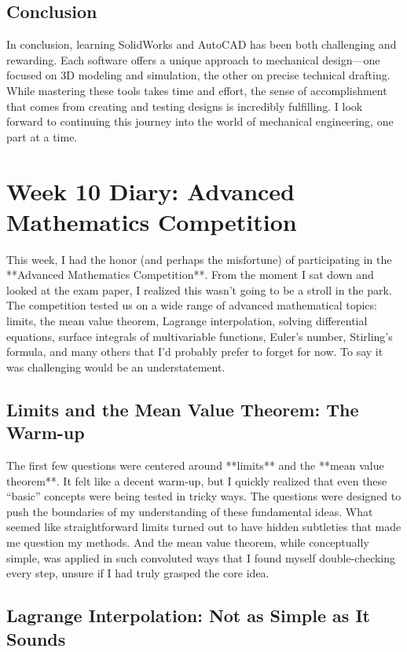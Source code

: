 \documentclass[a4paper]{article} 	%
\begin{document}
\subsection*{Conclusion}

In conclusion, learning SolidWorks and AutoCAD has been both challenging and rewarding. Each software offers a unique approach to mechanical design—one focused on 3D modeling and simulation, the other on precise technical drafting. While mastering these tools takes time and effort, the sense of accomplishment that comes from creating and testing designs is incredibly fulfilling. I look forward to continuing this journey into the world of mechanical engineering, one part at a time.

\section{Week 10 Diary: Advanced Mathematics Competition}

This week, I had the honor (and perhaps the misfortune) of participating in the **Advanced Mathematics Competition**. From the moment I sat down and looked at the exam paper, I realized this wasn’t going to be a stroll in the park. The competition tested us on a wide range of advanced mathematical topics: limits, the mean value theorem, Lagrange interpolation, solving differential equations, surface integrals of multivariable functions, Euler’s number, Stirling’s formula, and many others that I’d probably prefer to forget for now. To say it was challenging would be an understatement. 

\subsection*{Limits and the Mean Value Theorem: The Warm-up}

The first few questions were centered around **limits** and the **mean value theorem**. It felt like a decent warm-up, but I quickly realized that even these “basic” concepts were being tested in tricky ways. The questions were designed to push the boundaries of my understanding of these fundamental ideas. What seemed like straightforward limits turned out to have hidden subtleties that made me question my methods. And the mean value theorem, while conceptually simple, was applied in such convoluted ways that I found myself double-checking every step, unsure if I had truly grasped the core idea.

\subsection*{Lagrange Interpolation: Not as Simple as It Sounds}
\end{document}
